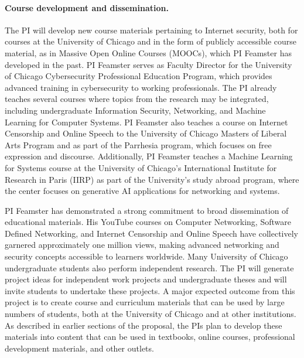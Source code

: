 \paragraph{Course development and dissemination.} The PI will develop new course materials
pertaining to Internet security, both for courses at the University of Chicago
and in the form of publicly accessible course material, as in Massive Open
Online Courses (MOOCs), which PI Feamster has developed in the past. PI
Feamster serves as Faculty Director for the University of Chicago
Cybersecurity Professional Education Program, which provides advanced training
in cybersecurity to working professionals. The PI already teaches several
courses where topics from the research may be integrated, including
undergraduate Information Security, Networking, and Machine Learning for
Computer Systems. PI Feamster also teaches a course on Internet Censorship and
Online Speech to the University of Chicago Masters of Liberal Arts Program and
as part of the Parrhesia program, which focuses on free expression and
discourse.  Additionally, PI Feamster teaches a Machine Learning for Systems
course at the University of Chicago's International Institute for Research in
Paris (IIRP) as part of the University's study abroad program, where the
center focuses on generative AI applications for networking and systems.

PI Feamster has demonstrated a strong commitment to broad dissemination of
educational materials. His YouTube courses on Computer Networking, Software
Defined Networking, and Internet Censorship and Online Speech have
collectively garnered approximately one million views, making advanced
networking and security concepts accessible to learners worldwide. Many
University of Chicago undergraduate students also perform independent research.
The PI will generate project ideas for independent work projects and
undergraduate theses and will invite students to undertake these projects. A
major expected outcome from this project is to create course and curriculum
materials that can be used by large numbers of students, both at the University
of Chicago and at other institutions. As described in earlier sections of the
proposal, the PIs plan to develop these materials into content that can be used
in textbooks, online courses, professional development materials, and other
outlets.

